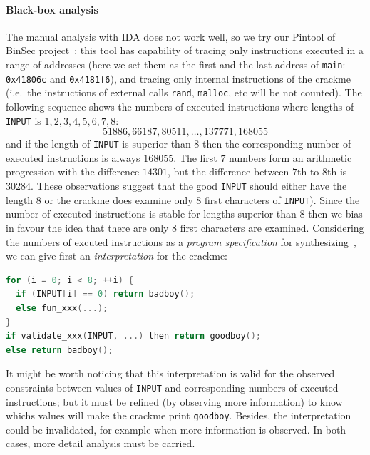 \documentclass{easychair}
\begin{document}
\paragraph{Black-box analysis}
The manual analysis with IDA does not work well, so we try our Pintool of BinSec project~\autocite{binsec}: this tool has capability of tracing only instructions executed in a range of addresses (here we set them as the first and the last address of \texttt{main}: \texttt{0x41806c} and \texttt{0x4181f6}), and tracing only internal instructions of the crackme (i.e.~the instructions of external calls \texttt{rand}, \texttt{malloc}, etc will be not counted). The following sequence shows the numbers of executed instructions where lengths of \texttt{INPUT} is $1, 2, 3, 4, 5, 6, 7, 8$:
\begin{equation*}
  51886, 66187, 80511, \dots, 137771, 168055
\end{equation*}
and if the length of \texttt{INPUT} is superior than $8$ then the corresponding number of executed instructions is always $168055$. The first $7$ numbers form an arithmetic progression with the difference $14301$, but the difference between $7$th to $8$th is $30284$. These observations suggest that the good \texttt{INPUT} should either have the length $8$ or the crackme does examine only $8$ first characters of \texttt{INPUT}). Since the number of executed instructions is stable for lengths superior than $8$ then we bias in favour the idea that there are only $8$ first characters are examined. Considering the numbers of excuted instructions as a \emph{program specification} for synthesizing~\autocite{GulwaniPPDP102}, we can give first an \emph{interpretation} for the crackme:
\begin{lstlisting}[frame=lines, caption={Synthesizing of the crackme}, captionpos=b, boxpos=b, language={C}, label=lst:synthesis]
for (i = 0; i < 8; ++i) {
  if (INPUT[i] == 0) return badboy();
  else fun_xxx(...);
}
if validate_xxx(INPUT, ...) then return goodboy();
else return badboy();
\end{lstlisting}
It might be worth noticing that this interpretation is valid for the observed constraints between values of \texttt{INPUT} and corresponding numbers of executed instructions; but it must be refined (by observing more information) to know whichs values will make the crackme print \texttt{goodboy}. Besides, the interpretation could be invalidated, for example when more information is observed. In both cases, more detail analysis must be carried. 
\end{document}
